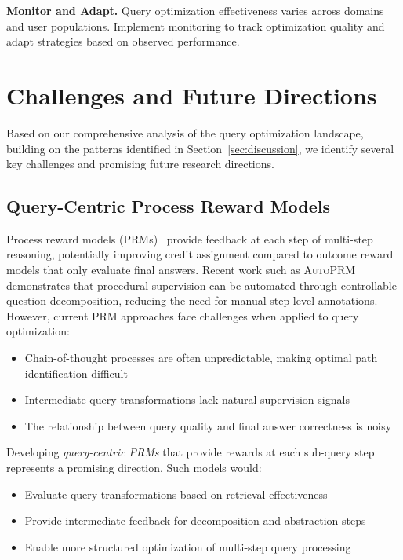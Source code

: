 \documentclass{article}
\begin{document}
\textbf{Monitor and Adapt.} Query optimization effectiveness varies across domains and user populations. Implement monitoring to track optimization quality and adapt strategies based on observed performance.

\section{Challenges and Future Directions}\label{sec:challenges}

Based on our comprehensive analysis of the query optimization landscape, building on the patterns identified in Section~\ref{sec:discussion}, we identify several key challenges and promising future research directions.

\subsection{Query-Centric Process Reward Models}

Process reward models (PRMs)~\citep{prms_1,prms_2} provide feedback at each step of multi-step reasoning, potentially improving credit assignment compared to outcome reward models that only evaluate final answers. Recent work such as \textsc{AutoPRM}~\citep{AutoPRM} demonstrates that procedural supervision can be automated through controllable question decomposition, reducing the need for manual step-level annotations. However, current PRM approaches face challenges when applied to query optimization:

\begin{itemize}[leftmargin=*,nosep]
    \item Chain-of-thought processes are often unpredictable, making optimal path identification difficult
    \item Intermediate query transformations lack natural supervision signals
    \item The relationship between query quality and final answer correctness is noisy
\end{itemize}

Developing \textit{query-centric PRMs} that provide rewards at each sub-query step represents a promising direction. Such models would:
\begin{itemize}[leftmargin=*,nosep]
    \item Evaluate query transformations based on retrieval effectiveness
    \item Provide intermediate feedback for decomposition and abstraction steps
    \item Enable more structured optimization of multi-step query processing
\end{itemize}
\end{document}
